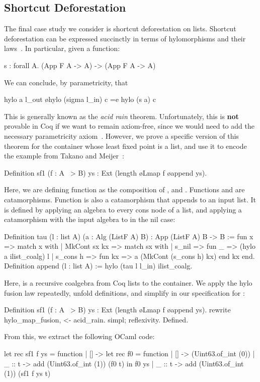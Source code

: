 \documentclass[a4paper,anonymous, UKenglish,cleveref, autoref, thm-restate]{lipics-v2021}
\begin{document}
\subsection{Shortcut Deforestation}\label{sec:shortcut}
The final case study we consider is shortcut deforestation on lists.  Shortcut
deforestation can be expressed succinctly in terms of hylomorphisms and their
laws~\cite{TakanoM95}. In particular, given a function:
\begin{coqcode}
  s  : forall A. (App F A -> A) -> (App F A -> A)
\end{coqcode}
We can conclude, by parametricity, that
\begin{coqcode}
  hylo a l_out \o hylo (sigma l_in) c =e hylo (s a) c
\end{coqcode}
This is generally known as the \emph{acid rain} theorem. Unfortunately, this is
\textbf{not} provable in Coq if we want to remain axiom-free, since we would
need to add the necessary parametricity
axiom~\cite{keller_et_al:LIPIcs.CSL.2012.381}.
However, we prove a specific version of this theorem for the container whose
least fixed point is a list, and use it to encode the example from Takano and
Meijer~\cite{TakanoM95}:
\begin{coqcode}
Definition sf1 (f : A ~> B) ys : Ext (length \o Lmap f \o append ys).
\end{coqcode}
Here, we are defining function  as the composition of ,
 and . Functions  and  are
catamorphisms. Function  is also a catamorphism that
appends  to an input list. It is defined by applying an algebra to
every cons node of a list, and applying a catamorphism with the input algebra
to  in the nil case:
\begin{coqcode}
Definition tau (l : list A) (a : Alg (ListF A) B) : App (ListF A) B -> B :=
  fun x => match x with | MkCont sx kx => match sx with
  | s_nil => fun _ => (hylo a ilist_coalg) l
  | s_cons h => fun kx => a (MkCont (s_cons h) kx)
  end kx end.
Definition append (l : list A) := hylo (tau l l_in) ilist_coalg.
\end{coqcode}
Here,  is a recursive coalgebra from Coq lists to the
 container. We apply the hylo fusion law repeatedly, unfold
definitions, and simplify in our specification for :
\begin{coqcode}
Definition sf1 (f : A ~> B) ys : Ext (length \o Lmap f \o append ys).
  rewrite hylo_map_fusion, <- acid_rain. simpl; reflexivity.
Defined.
\end{coqcode}
From this, we extract the following OCaml code:
\begin{ocamlcode}
let rec sf1 f ys =
  function | [] -> let rec f0 = function
                   | [] -> (Uint63.of_int (0))
                   | _ :: t -> add (Uint63.of_int (1)) (f0 t)
                   in f0 ys
           | _ :: t -> add (Uint63.of_int (1)) (sf1 f ys t)
\end{ocamlcode}
\end{document}
